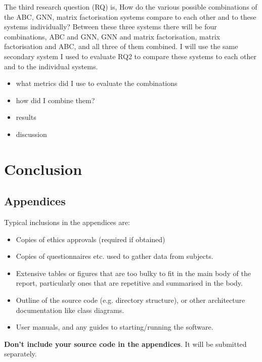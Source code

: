 \documentclass{l4proj}
\begin{document}
The third research question (RQ) is, How do the various possible combinations of the ABC, GNN, matrix factorisation systems compare to each other and to these systems individually? Between these three systems there will be four combinations, ABC and GNN, GNN and matrix factorisation, matrix factorisation and ABC, and all three of them combined. I will use the same secondary system I used to evaluate RQ2 to compare these systems to each other and to the individual systems. \\

\begin{itemize}
    \item what metrics did I use to evaluate the combinations
    \item how did I combine them?
    \item results
    \item discussion
\end{itemize}

\chapter{Conclusion}    

\begin{appendices}

\chapter{Appendices}

Typical inclusions in the appendices are:

\begin{itemize}
\item
  Copies of ethics approvals (required if obtained)
\item
  Copies of questionnaires etc. used to gather data from subjects.
\item
  Extensive tables or figures that are too bulky to fit in the main body of
  the report, particularly ones that are repetitive and summarised in the body.

\item Outline of the source code (e.g. directory structure), or other architecture documentation like class diagrams.

\item User manuals, and any guides to starting/running the software.

\end{itemize}

\textbf{Don't include your source code in the appendices}. It will be
submitted separately.

\end{appendices}






\end{document}
